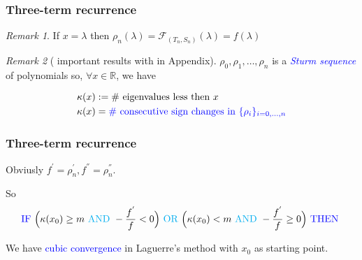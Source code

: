 \documentclass{beamer}
\newcommand{\R}{\mathbb{R}}
\newcommand{\effe}[2]{\mathcal{F}_{#1}(#2)}
\theoremstyle{definition} \newtheorem{de}{Def}
\theoremstyle{remark} \newtheorem{os}[de]{Remark}
\theoremstyle{plain} \newtheorem{te}[de]{Teo}
\theoremstyle{plain} \newtheorem{co}[de]{Cor}
\theoremstyle{plain} \newtheorem{pr}[de]{Prop}
\theoremstyle{plain} \newtheorem{lem}[de]{Lemm}
\theoremstyle{remark} \newtheorem{rem}[de]{Remark}
\begin{document}
\begin{frame}[label=BeforeSturmSequence]
  \frametitle{Three-term recurrence}

  \begin{os}
    If $x = \lambda$ then $\rho_n(\lambda)=\effe{(T_n,S_n)}{\lambda}=f(\lambda)$
  \end{os}

  \begin{os}[ important results with \hyperlink{SturmSequence}{} in Appendix]
    $\rho_0,\rho_1,\dots,\rho_n$ is a \textcolor{blue}{\emph{Sturm sequence}} of polynomials so, $\forall x\in\R$, we have

    \begin{align*}
      \kappa(x) &:= \text{\# eigenvalues less then } x \\
      \kappa(x) &= \textcolor{blue}{ \text{\# consecutive sign changes in } \{ \rho_i \}_{i=0,\dots,n} }
    \end{align*}
  \end{os}

  
\end{frame}

\begin{frame}
  \frametitle{Three-term recurrence}

  Obviusly $f^{'}=\rho_n^{'},f^{''}=\rho_n^{''}$.



  \pause

  So 
  \begin{equation*}
    \textcolor{blue}{\text{IF }} \Big( \kappa(x_0)\ge m \textcolor{cyan}{\text{ AND }} -\frac{f^{'}}{f}< 0 \Big) \textcolor{cyan}{\text{ OR }} \Big( \kappa(x_0) < m \textcolor{cyan}{\text{ AND }} -\frac{f^{'}}{f}\ge 0 \Big) \textcolor{blue}{\text{ THEN }}
  \end{equation*}

  \pause

  We have \textcolor{blue}{cubic convergence} in Laguerre's method with $x_0$ as starting point.

\end{frame}
\end{document}
